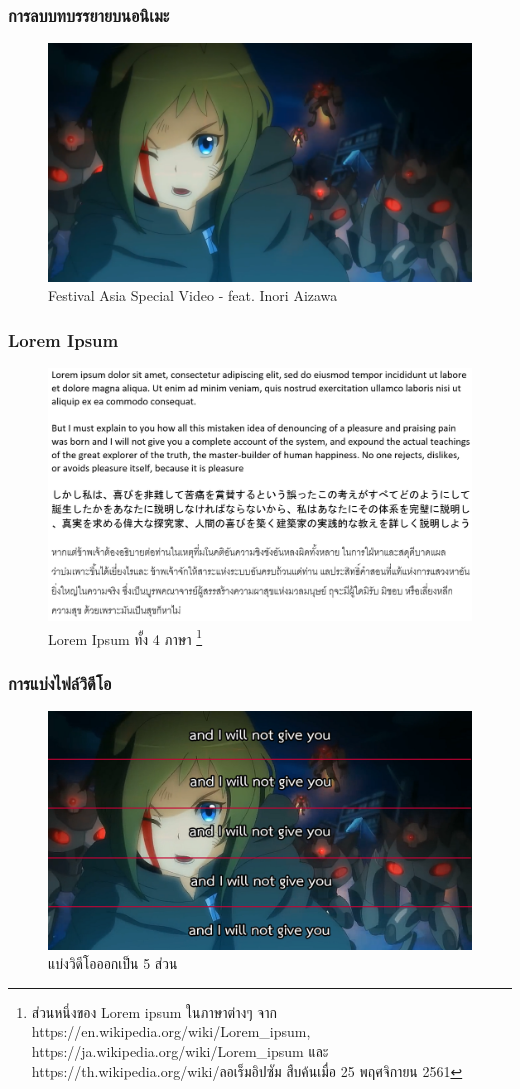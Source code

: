 \documentclass[xcolor=dvipsnames, xetex,serif]{beamer}
\numberwithin{equation}{section}
\begin{document}
		\begin{frame}
			\frametitle{การลบบทบรรยายบนอนิเมะ}
			\begin{figure}[H]
				\centering
				\includegraphics[width=0.8\linewidth]{images/inori-preview.png}
				\caption{ Festival Asia Special Video - feat. Inori Aizawa }
			\end{figure}
		\end{frame}
		\begin{frame}
			\frametitle{Lorem Ipsum}
				\begin{figure}[H]
				\centering
				\includegraphics[width=0.85\linewidth]{images/lorem4lang.png}
				\caption{Lorem Ipsum ทั้ง 4 ภาษา \footnote{ \tiny{ส่วนหนึ่งของ Lorem ipsum  ในภาษาต่างๆ จาก https://en.wikipedia.org/wiki/Lorem\_ipsum,  https://ja.wikipedia.org/wiki/Lorem\_ipsum และ  https://th.wikipedia.org/wiki/ลอเร็มอิปซัม สืบค้นเมื่อ 25 พฤศจิกายน 2561} } }
			\end{figure}
		\end{frame}
		\begin{frame}
			\frametitle{การแบ่งไฟล์วิดีโอ}
				\begin{figure}[H]
				\centering
				\includegraphics[width=0.8\linewidth]{images/inori-subbed-preview.png}
				\caption{แบ่งวิดีโอออกเป็น 5 ส่วน}
			\end{figure}
		\end{frame}
\end{document}
